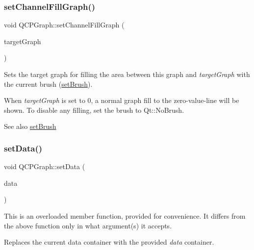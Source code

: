 \subsubsection{\texorpdfstring{set\+Channel\+Fill\+Graph()}{setChannelFillGraph()}}
{\footnotesize\ttfamily void Q\+C\+P\+Graph\+::set\+Channel\+Fill\+Graph (\begin{DoxyParamCaption}\item[{\hyperlink{class_q_c_p_graph}{Q\+C\+P\+Graph} $\ast$}]{target\+Graph }\end{DoxyParamCaption})}

Sets the target graph for filling the area between this graph and {\itshape target\+Graph} with the current brush (\hyperlink{class_q_c_p_abstract_plottable_a7a4b92144dca6453a1f0f210e27edc74}{set\+Brush}).

When {\itshape target\+Graph} is set to 0, a normal graph fill to the zero-\/value-\/line will be shown. To disable any filling, set the brush to Qt\+::\+No\+Brush.

\begin{DoxySeeAlso}{See also}
\hyperlink{class_q_c_p_abstract_plottable_a7a4b92144dca6453a1f0f210e27edc74}{set\+Brush} 
\end{DoxySeeAlso}
\mbox{\label{class_q_c_p_graph_a1eae9429a316b008e2d99b2d65a54395}} 
\subsubsection{\texorpdfstring{set\+Data()}{setData()}\hspace{0.1cm}{\footnotesize\ttfamily [1/2]}}
{\footnotesize\ttfamily void Q\+C\+P\+Graph\+::set\+Data (\begin{DoxyParamCaption}\item[{Q\+Shared\+Pointer$<$ \hyperlink{qcustomplot_8h_a2e5583d1ae212f0deb10537cf975a15a}{Q\+C\+P\+Graph\+Data\+Container} $>$}]{data }\end{DoxyParamCaption})}

This is an overloaded member function, provided for convenience. It differs from the above function only in what argument(s) it accepts.

Replaces the current data container with the provided {\itshape data} container.

